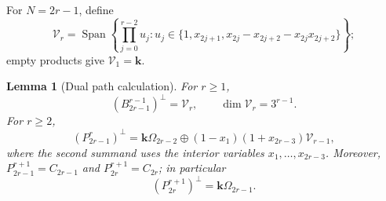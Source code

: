 \documentclass[reqno]{article}
\theoremstyle{plain} %
\newtheorem{lemma}[theorem]{Lemma}
\theoremstyle{definition}
\theoremstyle{remark}
\DeclareMathOperator{\Span}{Span}
\newcommand{\K} {\mathbf{k}}
\numberwithin{equation}{section}
\begin{document}
For $N=2r-1$, define
\begin{equation}\label{eq:dual-path-V}
\mathcal V_r=\Span\left\{
 \prod_{j=0}^{r-2}u_j:
 u_j\in\{1,x_{2j+1},x_{2j}-x_{2j+2}-x_{2j}x_{2j+2}\}
\right\};
\end{equation}
empty products give $\mathcal V_1=\K$.

\begin{lemma}[Dual path calculation]\label{lem:dual-path}
For $r\ge1$,
\begin{equation}\label{eq:dual-closed-path}
(B_{2r-1}^{r-1})^\perp=\mathcal V_r,
\qquad \dim\mathcal V_r=3^{r-1}.
\end{equation}
For $r\ge2$,
\begin{equation}\label{eq:dual-odd-open-path}
(P_{2r-1}^{r})^\perp
 =\K\Omega_{2r-2}\oplus
 (1-x_1)(1+x_{2r-3})\mathcal V_{r-1},
\end{equation}
where the second summand uses the interior variables
$x_1,\ldots,x_{2r-3}$. Moreover, $P_{2r-1}^{r+1}=C_{2r-1}$
and $P_{2r}^{r+1}=C_{2r}$; in particular
\begin{equation}\label{eq:dual-even-open-path}
(P_{2r}^{r+1})^\perp=\K\Omega_{2r-1}.
\end{equation}
\end{lemma}
\end{document}
